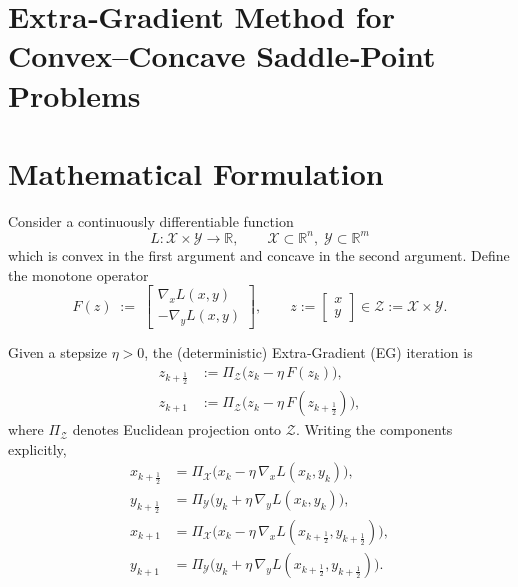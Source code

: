 \documentclass{article}
\newcommand{\R}{\mathbb{R}}
\begin{document}
\section*{Extra‑Gradient Method for Convex–Concave Saddle‑Point Problems}

\section*{Mathematical Formulation}
Consider a continuously differentiable function 
\[
L:\mathcal{X}\times\mathcal{Y}\to\R,
\qquad \mathcal{X}\subset\R^{n},\;\mathcal{Y}\subset\R^{m}
\]
which is convex in the first argument and concave in the second argument.
Define the monotone operator
\[
F(z)\;:=\;
\begin{bmatrix}
\nabla_{x}L(x,y)\\[2mm]
-\nabla_{y}L(x,y)
\end{bmatrix},
\qquad 
z:=\begin{bmatrix}x\\y\end{bmatrix}\in\mathcal{Z}:=\mathcal{X}\times\mathcal{Y}.
\]

Given a stepsize $\eta>0$, the (deterministic) Extra‑Gradient (EG) iteration is
\[
\boxed{
\begin{aligned}
z_{k+\frac12} &:= \Pi_{\mathcal{Z}}\!\bigl(z_{k}-\eta\,F(z_{k})\bigr),\\[1mm]
z_{k+1}       &:= \Pi_{\mathcal{Z}}\!\bigl(z_{k}-\eta\,F(z_{k+\frac12})\bigr),
\end{aligned}}
\tag{EG}
\]
where $\Pi_{\mathcal{Z}}$ denotes Euclidean projection onto $\mathcal{Z}$.
Writing the components explicitly,
\[
\begin{aligned}
x_{k+\frac12}&= \Pi_{\mathcal{X}}\!\bigl(x_{k}-\eta\,\nabla_{x}L(x_{k},y_{k})\bigr),\\
y_{k+\frac12}&= \Pi_{\mathcal{Y}}\!\bigl(y_{k}+\eta\,\nabla_{y}L(x_{k},y_{k})\bigr),\\[1mm]
x_{k+1}&= \Pi_{\mathcal{X}}\!\bigl(x_{k}-\eta\,\nabla_{x}L(x_{k+\frac12},y_{k+\frac12})\bigr),\\
y_{k+1}&= \Pi_{\mathcal{Y}}\!\bigl(y_{k}+\eta\,\nabla_{y}L(x_{k+\frac12},y_{k+\frac12})\bigr).
\end{aligned}
\]
\end{document}
